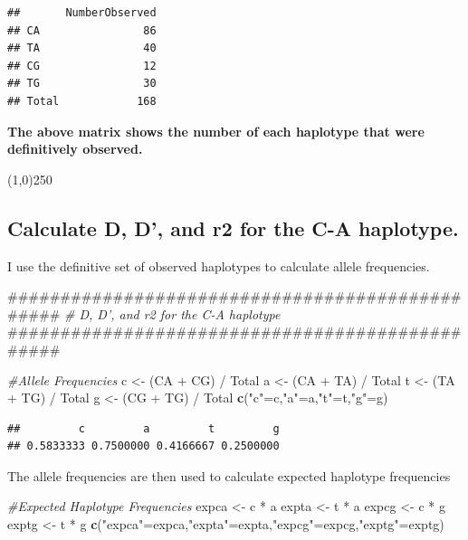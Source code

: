 \documentclass[]{article}
\newenvironment{Shaded}{\begin{snugshade}}{\end{snugshade}}
\newcommand{\KeywordTok}[1]{\textcolor[rgb]{0.13,0.29,0.53}{\textbf{{#1}}}}
\newcommand{\StringTok}[1]{\textcolor[rgb]{0.31,0.60,0.02}{{#1}}}
\newcommand{\CommentTok}[1]{\textcolor[rgb]{0.56,0.35,0.01}{\textit{{#1}}}}
\newcommand{\NormalTok}[1]{{#1}}
\begin{document}
\begin{verbatim}
##       NumberObserved
## CA                86
## TA                40
## CG                12
## TG                30
## Total            168
\end{verbatim}

\textbf{The above matrix shows the number of each haplotype that were
definitively observed.}

\begin{center}
\line(1,0){250}
\end{center}

\subsection{Calculate D, D', and r2 for the C-A
haplotype.}\label{calculate-d-d-and-r2-for-the-c-a-haplotype.}

I use the definitive set of observed haplotypes to calculate allele
frequencies.

\begin{Shaded}
\begin{Highlighting}[]
\NormalTok{################################################}
\CommentTok{# D, D', and r2 for the C-A haplotype}
\NormalTok{################################################}

\CommentTok{#Allele Frequencies}
\NormalTok{c <-}\StringTok{ }\NormalTok{(CA +}\StringTok{ }\NormalTok{CG) /}\StringTok{ }\NormalTok{Total}
\NormalTok{a <-}\StringTok{ }\NormalTok{(CA +}\StringTok{ }\NormalTok{TA) /}\StringTok{ }\NormalTok{Total}
\NormalTok{t <-}\StringTok{ }\NormalTok{(TA +}\StringTok{ }\NormalTok{TG) /}\StringTok{ }\NormalTok{Total}
\NormalTok{g <-}\StringTok{ }\NormalTok{(CG +}\StringTok{ }\NormalTok{TG) /}\StringTok{ }\NormalTok{Total}
\KeywordTok{c}\NormalTok{(}\StringTok{"c"}\NormalTok{=c,}\StringTok{"a"}\NormalTok{=a,}\StringTok{"t"}\NormalTok{=t,}\StringTok{"g"}\NormalTok{=g)}
\end{Highlighting}
\end{Shaded}

\begin{verbatim}
##         c         a         t         g 
## 0.5833333 0.7500000 0.4166667 0.2500000
\end{verbatim}

The allele frequencies are then used to calculate expected haplotype
frequencies

\begin{Shaded}
\begin{Highlighting}[]
\CommentTok{#Expected Haplotype Frequencies}
\NormalTok{expca <-}\StringTok{ }\NormalTok{c *}\StringTok{ }\NormalTok{a}
\NormalTok{expta <-}\StringTok{ }\NormalTok{t *}\StringTok{ }\NormalTok{a}
\NormalTok{expcg <-}\StringTok{ }\NormalTok{c *}\StringTok{ }\NormalTok{g}
\NormalTok{exptg <-}\StringTok{ }\NormalTok{t *}\StringTok{ }\NormalTok{g}
\KeywordTok{c}\NormalTok{(}\StringTok{"expca"}\NormalTok{=expca,}\StringTok{"expta"}\NormalTok{=expta,}\StringTok{"expcg"}\NormalTok{=expcg,}\StringTok{"exptg"}\NormalTok{=exptg)}
\end{Highlighting}
\end{Shaded}
\end{document}

